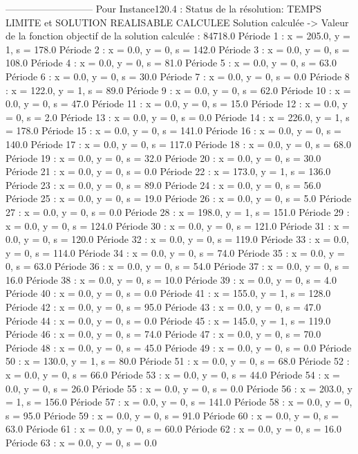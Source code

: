 ---------------------------
Pour Instance120.4 :
Status de la résolution: TEMPS LIMITE et SOLUTION REALISABLE CALCULEE
Solution calculée
-> Valeur de la fonction objectif de la solution calculée :  84718.0
Période 1 : x = 205.0, y = 1, s = 178.0
Période 2 : x = 0.0, y = 0, s = 142.0
Période 3 : x = 0.0, y = 0, s = 108.0
Période 4 : x = 0.0, y = 0, s = 81.0
Période 5 : x = 0.0, y = 0, s = 63.0
Période 6 : x = 0.0, y = 0, s = 30.0
Période 7 : x = 0.0, y = 0, s = 0.0
Période 8 : x = 122.0, y = 1, s = 89.0
Période 9 : x = 0.0, y = 0, s = 62.0
Période 10 : x = 0.0, y = 0, s = 47.0
Période 11 : x = 0.0, y = 0, s = 15.0
Période 12 : x = 0.0, y = 0, s = 2.0
Période 13 : x = 0.0, y = 0, s = 0.0
Période 14 : x = 226.0, y = 1, s = 178.0
Période 15 : x = 0.0, y = 0, s = 141.0
Période 16 : x = 0.0, y = 0, s = 140.0
Période 17 : x = 0.0, y = 0, s = 117.0
Période 18 : x = 0.0, y = 0, s = 68.0
Période 19 : x = 0.0, y = 0, s = 32.0
Période 20 : x = 0.0, y = 0, s = 30.0
Période 21 : x = 0.0, y = 0, s = 0.0
Période 22 : x = 173.0, y = 1, s = 136.0
Période 23 : x = 0.0, y = 0, s = 89.0
Période 24 : x = 0.0, y = 0, s = 56.0
Période 25 : x = 0.0, y = 0, s = 19.0
Période 26 : x = 0.0, y = 0, s = 5.0
Période 27 : x = 0.0, y = 0, s = 0.0
Période 28 : x = 198.0, y = 1, s = 151.0
Période 29 : x = 0.0, y = 0, s = 124.0
Période 30 : x = 0.0, y = 0, s = 121.0
Période 31 : x = 0.0, y = 0, s = 120.0
Période 32 : x = 0.0, y = 0, s = 119.0
Période 33 : x = 0.0, y = 0, s = 114.0
Période 34 : x = 0.0, y = 0, s = 74.0
Période 35 : x = 0.0, y = 0, s = 63.0
Période 36 : x = 0.0, y = 0, s = 54.0
Période 37 : x = 0.0, y = 0, s = 16.0
Période 38 : x = 0.0, y = 0, s = 10.0
Période 39 : x = 0.0, y = 0, s = 4.0
Période 40 : x = 0.0, y = 0, s = 0.0
Période 41 : x = 155.0, y = 1, s = 128.0
Période 42 : x = 0.0, y = 0, s = 95.0
Période 43 : x = 0.0, y = 0, s = 47.0
Période 44 : x = 0.0, y = 0, s = 0.0
Période 45 : x = 145.0, y = 1, s = 119.0
Période 46 : x = 0.0, y = 0, s = 74.0
Période 47 : x = 0.0, y = 0, s = 70.0
Période 48 : x = 0.0, y = 0, s = 45.0
Période 49 : x = 0.0, y = 0, s = 0.0
Période 50 : x = 130.0, y = 1, s = 80.0
Période 51 : x = 0.0, y = 0, s = 68.0
Période 52 : x = 0.0, y = 0, s = 66.0
Période 53 : x = 0.0, y = 0, s = 44.0
Période 54 : x = 0.0, y = 0, s = 26.0
Période 55 : x = 0.0, y = 0, s = 0.0
Période 56 : x = 203.0, y = 1, s = 156.0
Période 57 : x = 0.0, y = 0, s = 141.0
Période 58 : x = 0.0, y = 0, s = 95.0
Période 59 : x = 0.0, y = 0, s = 91.0
Période 60 : x = 0.0, y = 0, s = 63.0
Période 61 : x = 0.0, y = 0, s = 60.0
Période 62 : x = 0.0, y = 0, s = 16.0
Période 63 : x = 0.0, y = 0, s = 0.0
